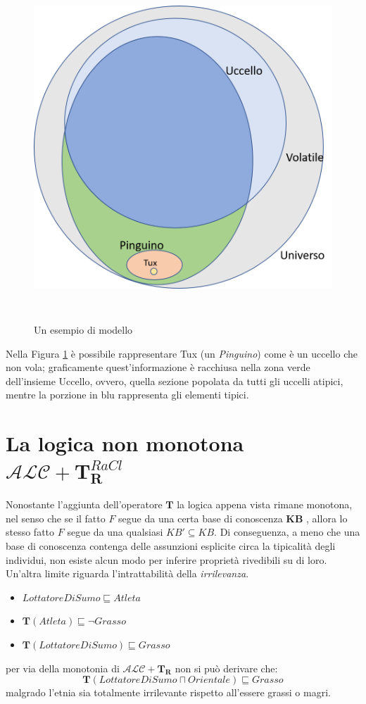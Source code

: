 \begin{figure}[h]
	\caption{Un esempio di modello}
	\label{fig:esempioM}
	\includegraphics[height=13cm,width=\textwidth]{immagini/ModelloALC_T.png}
	\centering
\end{figure}
Nella Figura \ref{fig:esempioM} è possibile rappresentare Tux (un \textit{Pinguino}) come è un uccello che non vola;
graficamente quest'informazione è racchiusa nella zona verde dell'insieme Uccello,
ovvero, quella sezione popolata da tutti gli uccelli atipici, mentre la porzione in blu rappresenta gli elementi tipici.

\section{La logica non monotona $ \mathcal{ALC} + \mathbf{T}_{\mathbf{R}}^{\mathit{RaCl}} $}
Nonostante l'aggiunta dell'operatore $ \mathbf{T} $ la logica appena vista rimane monotona, 
nel senso che se il fatto $ F $ segue da una certa base
di conoscenza \textbf{KB} , allora lo stesso fatto $ F $ segue da una qualsiasi $ KB' \subseteq KB $. 
Di conseguenza, a meno che una base di conoscenza contenga delle assunzioni esplicite circa la tipicalità degli individui, non esiste alcun modo per inferire proprietà rivedibili su di loro. \\
Un'altra limite riguarda l'intrattabilità della \textit{irrilevanza}.
\begin{itemize}
	\item[] $ LottatoreDiSumo \sqsubseteq Atleta $
	\item[] $ \mathbf{T}(Atleta) \sqsubseteq \neg Grasso $
	\item[] $ \mathbf{T}(LottatoreDiSumo) \sqsubseteq Grasso $
\end{itemize}
per via della monotonia di $ \mathcal{ALC + \mathbf{T_{R}}} $ non si può derivare che:
\[ \mathbf{T}(LottatoreDiSumo \sqcap Orientale) \sqsubseteq Grasso \] 
malgrado l'etnia sia totalmente irrilevante rispetto all'essere grassi o magri.

